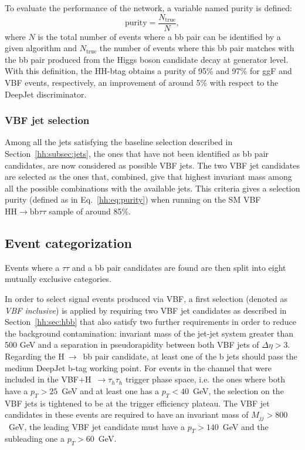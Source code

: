 \documentclass[../main.tex]{subfiles}
\begin{document}
To evaluate the performance of the network, a variable named purity is defined:
\begin{equation}
	\text{purity} = \frac{N_{\text{true}}}{N},
	\label{hh:eq:purity}
\end{equation}
where $N$ is the total number of events where a bb pair can be identified by a given algorithm and $N_{\text{true}}$ the number of events where this bb pair matches with the bb pair produced from the Higgs boson candidate decay at generator level. With this definition, the HH-btag obtains a purity of 95\% and 97\% for ggF and VBF events, respectively, an improvement of around 5\% with respect to the DeepJet discriminator.


\subsubsection{VBF jet selection}

Among all the jets satisfying the baseline selection described in Section~\ref{hh:subsec:jets}, the ones that have not been identified as bb pair candidates, are now considered as possible VBF jets. The two VBF jet candidates are selected as the ones that, combined, give that highest invariant mass among all the possible combinations with the available jets. This criteria gives a selection purity (defined as in Eq.~\ref{hh:eq:purity}) when running on the SM VBF $\text{HH}\to\text{bb}\tau\tau$ sample of around 85\%.

\subsection{Event categorization}
\label{hh:sec:event_categorization}

Events where a $\tau\tau$ and a bb pair candidates are found are then split into eight mutually exclusive categories. 

In order to select signal events produced via VBF, a first selection (denoted as \textit{VBF inclusive}) is applied by requiring two VBF jet candidates as described in Section~\ref{hh:sec:hbb} that also satisfy two further requirements in order to reduce the background contamination: invariant mass of the jet-jet system greater than 500 GeV and a separation in pseudorapidity between both VBF jets of $\Delta\eta>3$. Regarding the H$~\to$~bb pair candidate, at least one of the b jets should pass the medium DeepJet b-tag working point. For events in the \tauh\tauh{} channel that were included in the VBF+H~$\to\tau_h\tau_h$ trigger phase space, i.e. the ones where both \tauh{} have a $p_T>25$~GeV and at least one has a $p_T<40$~GeV, the selection on the VBF jets is tightened to be at the trigger efficiency plateau. The VBF jet candidates in these events are required to have an invariant mass of $M_{jj}>800$~GeV, the leading VBF jet candidate must have a $p_T>140$~GeV and the subleading one a $p_T>60$~GeV.
\end{document}
